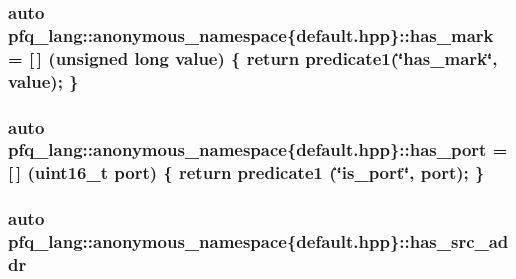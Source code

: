 \hypertarget{namespacepfq__lang_1_1anonymous__namespace_02default_8hpp_03_a0f9dc3f39bf9793e766b6312718483f1}{
\subsubsection[{has\+\_\+mark}]{\setlength{\rightskip}{0pt plus 5cm}auto pfq\+\_\+lang\+::anonymous\+\_\+namespace\{default.\+hpp\}\+::has\+\_\+mark = \mbox{[}$\,$\mbox{]} (unsigned long value) \{ return {\bf predicate1}(\char`\"{}has\+\_\+mark\char`\"{}, value); \}}}\label{namespacepfq__lang_1_1anonymous__namespace_02default_8hpp_03_a0f9dc3f39bf9793e766b6312718483f1}
\hypertarget{namespacepfq__lang_1_1anonymous__namespace_02default_8hpp_03_ad2840696177c5f4f6f2072bcaae7407e}{
\subsubsection[{has\+\_\+port}]{\setlength{\rightskip}{0pt plus 5cm}auto pfq\+\_\+lang\+::anonymous\+\_\+namespace\{default.\+hpp\}\+::has\+\_\+port = \mbox{[}$\,$\mbox{]} (uint16\+\_\+t {\bf port}) \{ return {\bf predicate1} (\char`\"{}is\+\_\+port\char`\"{}, port); \}}}\label{namespacepfq__lang_1_1anonymous__namespace_02default_8hpp_03_ad2840696177c5f4f6f2072bcaae7407e}
\hypertarget{namespacepfq__lang_1_1anonymous__namespace_02default_8hpp_03_aabc75799de679df702f4179ead82114c}{
\subsubsection[{has\+\_\+src\+\_\+addr}]{\setlength{\rightskip}{0pt plus 5cm}auto pfq\+\_\+lang\+::anonymous\+\_\+namespace\{default.\+hpp\}\+::has\+\_\+src\+\_\+addr}}\label{namespacepfq__lang_1_1anonymous__namespace_02default_8hpp_03_aabc75799de679df702f4179ead82114c}
